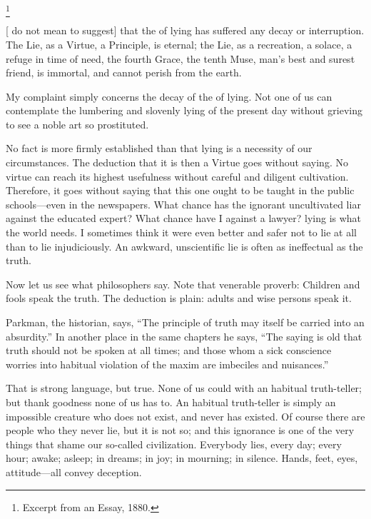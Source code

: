 \documentclass[../interior-demo.tex]{subfiles}
\begin{document}
\begin{upperpage}
\null
{}
\footnote{Excerpt from an Essay, 1880.}
\end{upperpage}
[ do not mean to suggest] that the  of lying has
suffered any decay or interruption. The Lie, as a Virtue, a
Principle, is eternal; the Lie, as a recreation, a solace, a refuge in
time of need, the fourth Grace, the tenth Muse, man's best and surest
friend, is immortal, and cannot perish from the earth.

My complaint simply concerns the decay of the  of lying.
Not one of us can contemplate the lumbering and slovenly lying of the
present day without grieving to see a noble art so prostituted.

No fact is more firmly established than that lying is a necessity of our
circumstances. The deduction that it is then a Virtue goes without
saying. No virtue can reach its highest usefulness without careful and
diligent cultivation. Therefore, it goes without saying that this one
ought to be taught in the public schools---even in the newspapers. What
chance has the ignorant uncultivated liar against the educated expert?
What chance have I against a lawyer?  lying
is what the world needs. I sometimes think it were even better and safer
not to lie at all than to lie injudiciously. An awkward, unscientific
lie is often as ineffectual as the truth.

Now let us see what philosophers say. Note that venerable proverb:
Children and fools  speak the truth. The deduction is plain:
adults and wise persons  speak it.

Parkman, the historian,
says, ``The principle of truth may itself be carried into an absurdity.''
In another place in the same chapters he says, ``The saying is old that
truth should not be spoken at all times; and those whom a sick
conscience worries into habitual violation of the maxim are imbeciles
and nuisances.''

That is strong language, but true.
None of us could  with an habitual truth-teller;
but thank goodness none of us has to. An habitual truth-teller is simply
an impossible creature who does not exist, and never has existed.
Of course there are people who  they
never lie, but it is not so; and this ignorance is one of the very
things that shame our so-called civilization. Everybody lies, every day;
every hour; awake; asleep; in dreams; in joy; in mourning; in silence.
Hands, feet, eyes, attitude---all convey deception.
\end{document}
